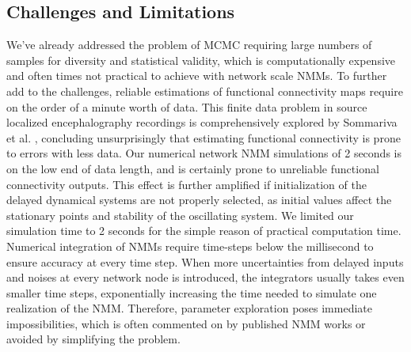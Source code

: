 \subsection{Challenges and Limitations}
We've already addressed the problem of MCMC requiring large numbers of samples for diversity and statistical validity, which is computationally expensive and often times not practical to achieve with network scale NMMs. To further add to the challenges, reliable estimations of functional connectivity maps require on the order of a minute worth of data. This finite data problem in source localized encephalography recordings is comprehensively explored by Sommariva et al. \cite{sommariva_comparative_2019}, concluding unsurprisingly that estimating functional connectivity is prone to errors with less data. Our numerical network NMM simulations of 2 seconds is on the low end of data length, and is certainly prone to unreliable functional connectivity outputs. This effect is further amplified if initialization of the delayed dynamical systems are not properly selected, as initial values affect the stationary points and stability of the oscillating system. We limited our simulation time to 2 seconds for the simple reason of practical computation time. Numerical integration of NMMs require time-steps below the millisecond to ensure accuracy at every time step. When more uncertainties from delayed inputs and noises at every network node is introduced, the integrators usually takes even smaller time steps, exponentially increasing the time needed to simulate one realization of the NMM. Therefore, parameter exploration poses immediate impossibilities, which is often commented on by published NMM works or avoided by simplifying the problem. 

